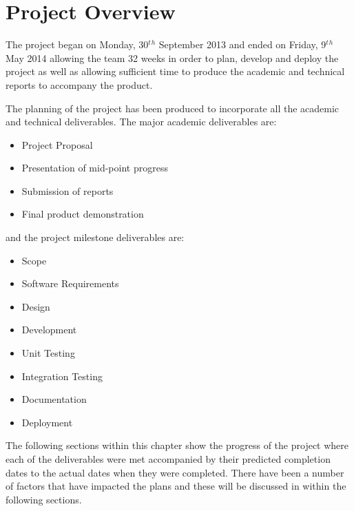 \section{Project Overview}
\label{sec:project_overview}

The project began on Monday, 30$^t$$^h$ September 2013 and ended on Friday,
9$^t$$^h$ May 2014 allowing the team 32 weeks in order to plan, develop and
deploy the project as well as allowing sufficient time to produce the academic
and technical reports to accompany the product.

The planning of the project has been produced to incorporate all the academic
and technical deliverables. The major academic deliverables are:

\begin{itemize}
  \item Project Proposal
  \item Presentation of mid-point progress
  \item Submission of reports
  \item Final product demonstration
\end{itemize}

and the project milestone deliverables are:

\begin{itemize}
  \item Scope
  \item Software Requirements
  \item Design
  \item Development
  \item Unit Testing
  \item Integration Testing
  \item Documentation
  \item Deployment
\end{itemize}

The following sections within this chapter show the progress of the project
where each of the deliverables were met accompanied by their predicted
completion dates to the actual dates when they were completed. There have been a
number of factors that have impacted the plans and these will be discussed in 
within the following sections.
